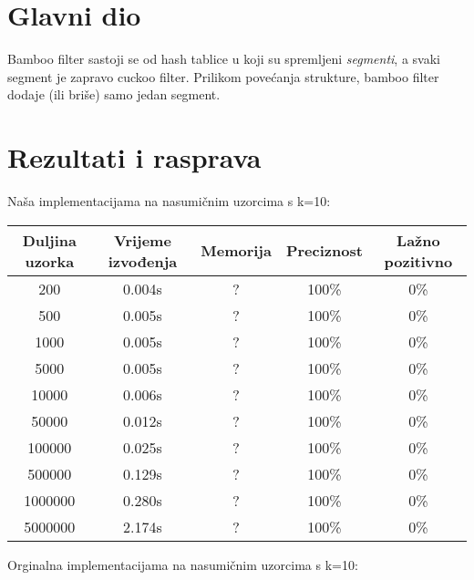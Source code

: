 \documentclass[seminarskirad]{fer}
\begin{document}
\chapter{Glavni dio}
\label{pog:glavni_dio}

Bamboo filter sastoji se od hash tablice u koji su spremljeni \textit{segmenti}, a svaki segment je zapravo cuckoo filter. Prilikom povećanja strukture, bamboo filter dodaje (ili briše) samo jedan segment.


\chapter{Rezultati i rasprava}
\label{pog:rezultati_i_rasprava}

Naša implementacijama na nasumičnim uzorcima s k=10:

\begin{center}
\begin{tabular}{||c c c c c||} 
 \hline
 Duljina uzorka & Vrijeme izvođenja & Memorija & Preciznost & Lažno pozitivno \\ [0.5ex] 
 \hline\hline
 200 & 0.004s & ? & 100\% & 0\% \\ 
 \hline
 500 & 0.005s & ? & 100\% & 0\% \\
 \hline
 1000 & 0.005s & ? & 100\% & 0\% \\
 \hline
 5000 & 0.005s & ? & 100\% & 0\% \\
 \hline
 10000 & 0.006s & ? & 100\% & 0\% \\
 \hline
 50000 & 0.012s & ? & 100\% & 0\% \\ 
 \hline
 100000 & 0.025s & ? & 100\% & 0\% \\
 \hline
 500000 & 0.129s & ? & 100\% & 0\% \\
 \hline
 1000000 & 0.280s & ? & 100\% & 0\% \\
 \hline
 5000000 & 2.174s & ? & 100\% & 0\% \\ [1ex] 
 \hline
\end{tabular}
\end{center}

Orginalna implementacijama na nasumičnim uzorcima s k=10:
\end{document}
